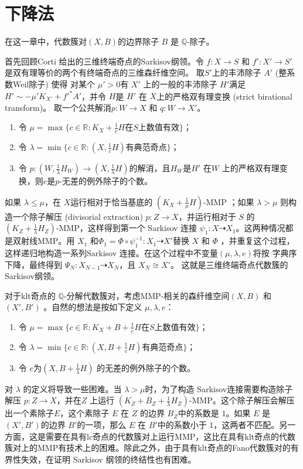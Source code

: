 \chapter{下降法}
在这一章中，代数簇对$(X,B)$的边界除子 $B$ 是 $\mathbb{Q}$-除子。 

首先回顾Corti \cite{cortiFactoringBirationalMaps} 给出的三维终端奇点的Sarkisov纲领。令 $f: X\to S$ 和 $f':X'\to S'$ 是双有理等价的两个有终端奇点的三维森纤维空间。
取$S'$上的丰沛除子 $A'$ (整系数Weil除子) 使得 对某个 $\mu'>0$有 $X'$ 上的一般的丰沛除子 $H'$满足$H'\sim -\mu'K_{X'}+f'^*A'$，并令 $H$是  $H'$ 在 $X$上的严格双有理变换 (strict birational transform)。 取一个公共解消$p: W\to X$ 和 $q:W \to X'$。
\begin{enumerate}
  \item 令 $\mu= \max \{c \in \mathbb{R} : K_{X}+\frac{1}{c}H \text{在} S \text{上数值有效} \}$；
  \item 令 $\lambda = \min \{c\in \mathbb{R}: (X,\frac{1}{c}H) \text{有典范奇点}  \}$；
  \item 令 $p:(W, \frac{1}{\lambda} H_{W})\to (X,\frac{1}{\lambda}H)$的解消，且$H_{W}$是$H'$ 在$W$ 上的严格双有理变换，则$e$是$p$-无差的例外除子的个数。
\end{enumerate}
如果 $\lambda \leqslant \mu$，在 $X$运行相对于恰当基底的 $(K_X+\frac{1}{\mu}H)$-MMP ；如果 $\lambda > \mu$ 则构造一个除子解压 (divisorial extraction) $ p:Z \to X$，并运行相对于 $ S$ 的 $ (K_Z+\frac{1}{\lambda}H_Z)$-MMP，这样得到第一个 Sarkisov 连接 $\psi_1: X\dashrightarrow  X_{1}$。这两种情况都是双射线MMP。用 $X_{1}$ 和$\Phi_{1}=\Phi\circ\psi_1^{-1}: X_1\dashrightarrow X'$替换 $X$ 和 $\Phi$ ，并重复这个过程，这样递归地构造一系列Sarkisov 连接。在这个过程中不变量$(\mu,\lambda,e)$将按 字典序下降，最终得到 $\Psi_{N}:X_{N-1} \dashrightarrow X_{N}$，且 $X_{N}\cong X'$。 这就是三维终端奇点代数簇的Sarkisov纲领。

对于klt奇点的 $\mathbb{Q}$-分解代数簇对，考虑MMP-相关的森纤维空间$(X,B)$ 和 $(X',B')$ 。自然的想法是按如下定义 $\mu,\lambda,e$：
\begin{enumerate}
  \item 令 $\mu= \max \{c \in \mathbb{R} : K_{X}+B+\frac{1}{c}H \text{在} S \text{上数值有效} \}$；
  \item 令 $\lambda = \min \{c\in \mathbb{R}: (X,B+\frac{1}{c}H) \text{有典范奇点}  \}$；
  \item 令 $e $为$  (X,B+\frac{1}{\lambda}H)$ 的无差的例外除子的个数。
\end{enumerate}

对 $\lambda$ 的定义将导致一些困难。当 $\lambda > \mu$时，为了构造 Sarkisov连接需要构造除子解压 $p:Z \to X$，并在$Z$ 上运行 $(K_Z+B_Z+\frac{1}{\lambda}H_Z)$-MMP。这个除子解压会解压出一个素除子$E$，这个素除子 $E$ 在 $Z$ 的边界  $B_Z$中的系数是 $1$。如果 $E$ 是 $(X',B')$的边界 $B'$的一项，那么 $E$ 在 $B'$中的系数小于 $1$，这两者不匹配。另一方面，这是需要在具有lc奇点的代数簇对上运行MMP，这比在具有klt奇点的代数簇对上的MMP有技术上的困难。除此之外，由于具有klt奇点的Fano代数簇对的有界性失效，在证明 Sarkisov 纲领的终结性也有困难。

